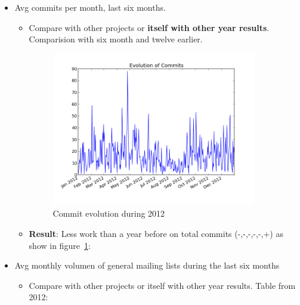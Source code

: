 \documentclass[11pt]{scrartcl}
\begin{document}
\begin{itemize}
    \item Avg commits per month, last six months.
        \begin{itemize}
            \item Compare with other projects or \textbf{itself with other year results}. Comparision with six month and twelve earlier.
            \begin{figure}[H]
            \begin{center}
              \includegraphics[width=0.9\textwidth]{libcsvanaly2/script_sample/basic_timeseries.png}
              \caption{Commit evolution during 2012}
              \label{fig:2012-monthy-commmits}
            \end{center}
            \end{figure}

            \item \textbf{Result}: Less work than a year before on total commits (-,-,-,-,-,+) as show in figure~\ref{fig:2012-monthy-commmits}:
        \end{itemize}
    \item Avg monthly volumen of general mailing lists during the last six months
    \begin{itemize}
        \item Compare with other projects or itself with other year results. Table from 2012:


\end{itemize}
\end{itemize}
\end{document}
